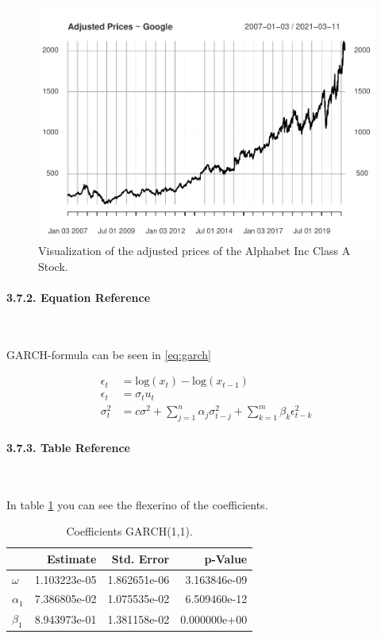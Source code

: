 \documentclass[
]{article}
\begin{document}
\begin{figure}

{\centering \includegraphics[width=0.7\linewidth]{00_main_files/figure-latex/fig1-1} 

}

\caption{Visualization of the adjusted prices of the Alphabet Inc Class A Stock.}\label{fig:fig1}
\end{figure}

\newpage

\hypertarget{equation-reference}{%
\paragraph{3.7.2. Equation Reference}\label{equation-reference}}

~

GARCH-formula can be seen in \ref{eq:garch}

\begin{align} \label{eq:garch}
  \epsilon_{t} &= \mathrm{log}(x_{t})-\mathrm{log}(x_{t-1}) \nonumber \\
  \epsilon_{t} &= \sigma_{t}u_{t} \\
  \sigma_{t}^{2} &=c \sigma^{2}+\sum_{j=1}^{n}\alpha_{j}\sigma_{t-j}^{2}+\sum_{k=1}^{m}\beta_{k}\epsilon_{t-k}^{2} \nonumber
\end{align}

\newpage

\hypertarget{table-reference}{%
\paragraph{3.7.3. Table Reference}\label{table-reference}}

~

In table \ref{tab:coeftable} you can see the flexerino of the
coefficients.

\begin{table}

\caption{\label{tab:coeftable}Coefficients GARCH(1,1).}
\centering
\begin{tabular}[t]{lrrr}
\toprule
  & Estimate & Std. Error & p-Value\\
\midrule
$\omega$ & 1.103223e-05 & 1.862651e-06 & 3.163846e-09\\
$\alpha_{1}$ & 7.386805e-02 & 1.075535e-02 & 6.509460e-12\\
$\beta_{1}$ & 8.943973e-01 & 1.381158e-02 & 0.000000e+00\\
\bottomrule
\end{tabular}
\end{table}
\end{document}
